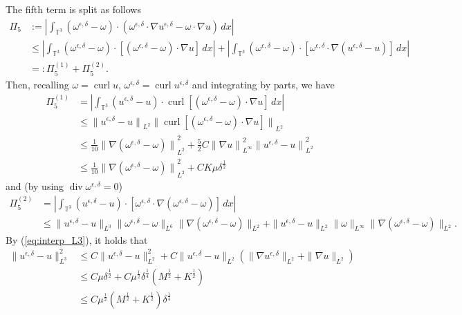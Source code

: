 \documentclass[reqno,10pt]{amsart}
\theoremstyle{definition}
\theoremstyle{remark}
\numberwithin{equation}{section}
\DeclareMathOperator{\dive}{div}
\DeclareMathOperator{\curl}{curl}
\begin{document}
The fifth term is split as follows
\[
\begin{aligned}
   \Pi_5&:= \left| \int_{\mathbb T^3} (\omega^{\epsilon,\delta}-\omega)\cdot \left( \omega^{\epsilon,\delta}\cdot\nabla u^{\epsilon,\delta} - \omega\cdot\nabla u \right) \,dx \right| \\
    &\le \left| \int_{\mathbb T^3} (\omega^{\epsilon,\delta}-\omega)\cdot \left[ (\omega^{\epsilon,\delta}-\omega)\cdot \nabla u \right] \,dx \right| + \left| \int_{\mathbb T^3} (\omega^{\epsilon,\delta}-\omega)\cdot \left[ \omega^{\epsilon,\delta} \cdot \nabla (u^{\epsilon,\delta}-u) \right] \,dx \right| \\
    &=:\Pi_{5}^{(1)} +\Pi_{5}^{(2)}.
\end{aligned}
\]
Then, recalling $\omega=\curl u$, $\omega^{\epsilon,\delta}=\curl u^{\epsilon,\delta}$ and integrating by parts, we have 
\[
\begin{aligned}
   \Pi_{5}^{(1)} &= \left| \int_{\mathbb T^3} (u^{\epsilon,\delta}-u)\cdot \curl \left[ (\omega^{\epsilon,\delta}-\omega)\cdot \nabla u \right] \,dx \right| \\
    &\le {\| u^{\epsilon,\delta} - u\|}_{L^2} {\| \curl \left[ (\omega^{\epsilon,\delta}-\omega)\cdot \nabla u \right]\|}_{L^2} \\
    &\le \frac{1}{10} {\| \nabla (\omega^{\epsilon,\delta}-\omega)\|}_{L^2}^2 + \frac{5}{2}C{ \|\nabla u\|}_{L^\infty}^2 {\| u^{\epsilon,\delta} - u\|}_{L^2}^2  \\
    &\le \frac{1}{10} {\| \nabla (\omega^{\epsilon,\delta}-\omega)\|}_{L^2}^2 + CK\mu\delta^{\frac{1}{2}}
\end{aligned}
\]
and (by using $\dive \omega^{\epsilon,\delta}=0$)
\[ 
\begin{aligned}
   \Pi_{5}^{(2)} &= \left| \int_{\mathbb T^3} (u^{\epsilon,\delta}-u) \cdot \left[ \omega^{\epsilon,\delta} \cdot \nabla(\omega^{\epsilon,\delta}-\omega) \right] \,dx \right| \\
    &\le \|u^{\epsilon,\delta}-u\|_{L^3} \|\omega^{\epsilon,\delta}-\omega\|_{L^6} \|\nabla (\omega^{\epsilon,\delta}-\omega)\|_{L^2} + \|u^{\epsilon,\delta}-u\|_{L^2} \|\omega\|_{L^\infty} \|\nabla(\omega^{\epsilon,\delta}-\omega)\|_{L^2}.
\end{aligned}
\]
By (\ref{eq:interp_L3}), it holds that 
\[
\begin{aligned}
    \|u^{\epsilon,\delta}-u\|_{L^3}^2 &\le C\|u^{\epsilon,\delta}-u\|_{L^2}^2 +  C\|u^{\epsilon,\delta}-u\|_{L^2} \left( \|\nabla u^{\epsilon,\delta}\|_{L^2} + \|\nabla u\|_{L^2} \right) \\
    &\le C\mu\delta^{\frac{1}{2}} + C\mu^{\frac{1}{2}}\delta^{\frac{1}{4}}(M^{\frac{1}{2}}+K^{\frac{1}{2}}) \\
    &\le C\mu^{\frac{1}{2}} (M^{\frac{1}{2}}+K^{\frac{1}{2}}) \delta^{\frac{1}{4}} 
\end{aligned}
\]
\end{document}
